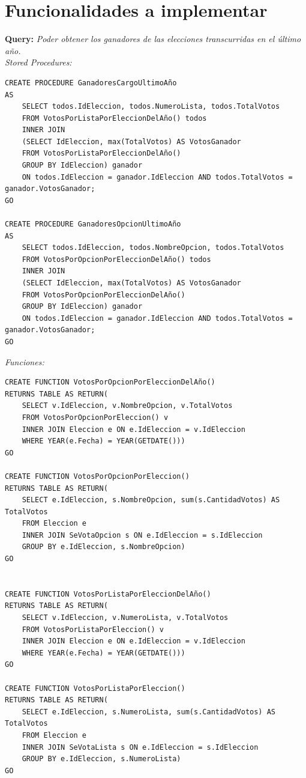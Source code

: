 \documentclass[10pt,a4paper]{article}
\begin{document}
\newpage
\section{Funcionalidades a implementar}

\textbf{Query:} \textit{Poder obtener los ganadores de las elecciones transcurridas en el último año.}\\

\textit{Stored Procedures:}

\begin{verbatim}
CREATE PROCEDURE GanadoresCargoUltimoAño
AS 
	SELECT todos.IdEleccion, todos.NumeroLista, todos.TotalVotos 
	FROM VotosPorListaPorEleccionDelAño() todos
	INNER JOIN
	(SELECT IdEleccion, max(TotalVotos) AS VotosGanador
	FROM VotosPorListaPorEleccionDelAño() 
	GROUP BY IdEleccion) ganador
	ON todos.IdEleccion = ganador.IdEleccion AND todos.TotalVotos = ganador.VotosGanador;
GO

CREATE PROCEDURE GanadoresOpcionUltimoAño
AS 
	SELECT todos.IdEleccion, todos.NombreOpcion, todos.TotalVotos 
	FROM VotosPorOpcionPorEleccionDelAño() todos
	INNER JOIN 
	(SELECT IdEleccion, max(TotalVotos) AS VotosGanador
	FROM VotosPorOpcionPorEleccionDelAño()
	GROUP BY IdEleccion) ganador
	ON todos.IdEleccion = ganador.IdEleccion AND todos.TotalVotos = ganador.VotosGanador;
GO
\end{verbatim}

\textit{Funciones:}

\begin{verbatim}
CREATE FUNCTION VotosPorOpcionPorEleccionDelAño()
RETURNS TABLE AS RETURN(
	SELECT v.IdEleccion, v.NombreOpcion, v.TotalVotos
	FROM VotosPorOpcionPorEleccion() v
	INNER JOIN Eleccion e ON e.IdEleccion = v.IdEleccion
	WHERE YEAR(e.Fecha) = YEAR(GETDATE()))
GO

CREATE FUNCTION VotosPorOpcionPorEleccion()
RETURNS TABLE AS RETURN(
	SELECT e.IdEleccion, s.NombreOpcion, sum(s.CantidadVotos) AS TotalVotos
	FROM Eleccion e 
	INNER JOIN SeVotaOpcion s ON e.IdEleccion = s.IdEleccion
	GROUP BY e.IdEleccion, s.NombreOpcion)
GO


CREATE FUNCTION VotosPorListaPorEleccionDelAño()
RETURNS TABLE AS RETURN(
	SELECT v.IdEleccion, v.NumeroLista, v.TotalVotos
	FROM VotosPorListaPorEleccion() v
	INNER JOIN Eleccion e ON e.IdEleccion = v.IdEleccion
	WHERE YEAR(e.Fecha) = YEAR(GETDATE()))
GO

CREATE FUNCTION VotosPorListaPorEleccion()
RETURNS TABLE AS RETURN(
	SELECT e.IdEleccion, s.NumeroLista, sum(s.CantidadVotos) AS TotalVotos
	FROM Eleccion e 
	INNER JOIN SeVotaLista s ON e.IdEleccion = s.IdEleccion	
	GROUP BY e.IdEleccion, s.NumeroLista)
GO
\end{verbatim}
\end{document}
